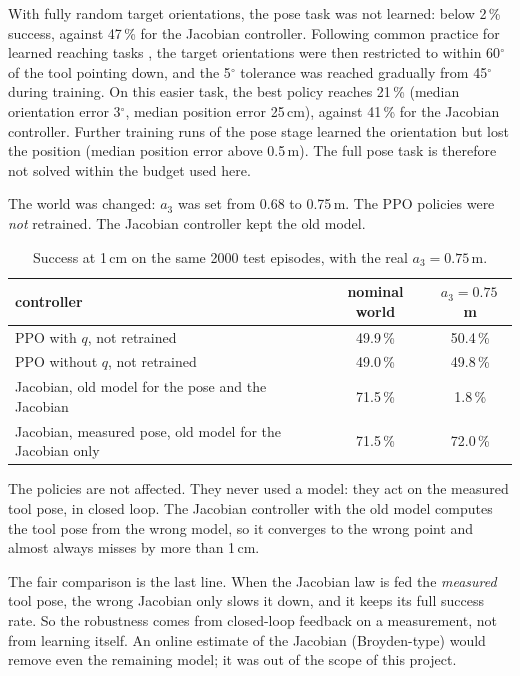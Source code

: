 \documentclass[10pt,a4paper]{article}
\newcommand{\head}[1]{\vspace{4pt}{\large\bfseries #1}\par}
\begin{document}
With fully random target orientations, the pose task was not learned: below 2\,\% success, against 47\,\% for the Jacobian controller.
Following common practice for learned reaching tasks \cite{orbit}, the target orientations were then restricted to within 60$^\circ$ of the tool pointing down, and the 5$^\circ$ tolerance was reached gradually from 45$^\circ$ during training.
On this easier task, the best policy reaches 21\,\% (median orientation error 3$^\circ$, median position error 25\,cm), against 41\,\% for the Jacobian controller.
Further training runs of the pose stage learned the orientation but lost the position (median position error above 0.5\,m).
The full pose task is therefore not solved within the budget used here.

\head{6. Robustness to a changed link length}
The world was changed: $a_3$ was set from 0.68 to 0.75\,m.
The PPO policies were \emph{not} retrained.
The Jacobian controller kept the old model.

\begin{table}[H]
\centering\small
\caption{Success at 1\,cm on the same 2000 test episodes, with the real $a_3 = 0.75$\,m.}
\label{tab:robust}
\begin{tabular}{lcc}
\toprule
controller & nominal world & $a_3 = 0.75$\,m \\
\midrule
PPO with $q$, not retrained & 49.9\,\% & 50.4\,\% \\
PPO without $q$, not retrained & 49.0\,\% & 49.8\,\% \\
Jacobian, old model for the pose and the Jacobian & 71.5\,\% & 1.8\,\% \\
Jacobian, measured pose, old model for the Jacobian only & 71.5\,\% & 72.0\,\% \\
\bottomrule
\end{tabular}
\end{table}

The policies are not affected.
They never used a model: they act on the measured tool pose, in closed loop.
The Jacobian controller with the old model computes the tool pose from the wrong model, so it converges to the wrong point and almost always misses by more than 1\,cm.

The fair comparison is the last line.
When the Jacobian law is fed the \emph{measured} tool pose, the wrong Jacobian only slows it down, and it keeps its full success rate.
So the robustness comes from closed-loop feedback on a measurement, not from learning itself.
An online estimate of the Jacobian (Broyden-type) would remove even the remaining model; it was out of the scope of this project.
\end{document}

